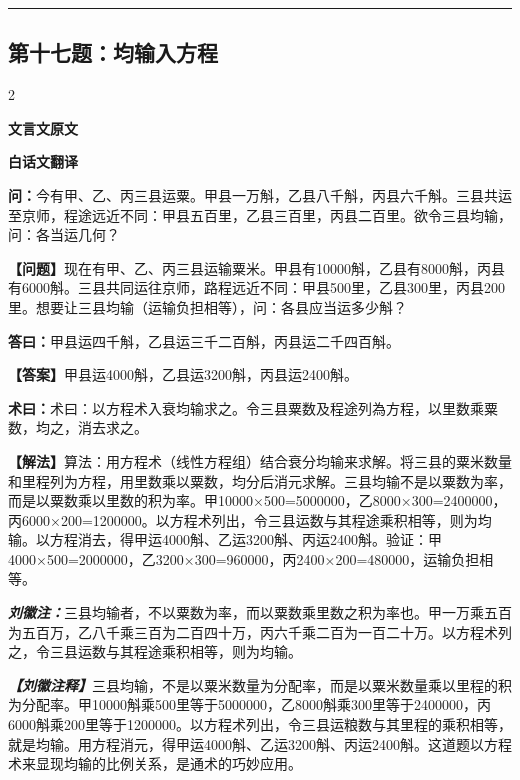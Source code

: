\documentclass[10pt,a4paper]{article}
\newcommand{\wen}[1]{\textbf{\color{problemcolor}问：}#1\par}
\newcommand{\da}[1]{\textbf{答曰：}#1\par}
\newcommand{\shu}[1]{\textbf{术曰：}#1\par}
\newcommand{\liuhui}[1]{{\color{commentarycolor}\textit{\textbf{刘徽注：}}#1\par}}
\newcommand{\classicalheader}[1]{{\centering\large\bfseries\color{classicalcolor} #1\par\vspace{0.5em}}}
\newcommand{\wenmodern}[1]{\textbf{\color{moderncolor}【问题】}#1\par}
\newcommand{\damodern}[1]{\textbf{【答案】}#1\par}
\newcommand{\shumodern}[1]{\textbf{【解法】}#1\par}
\newcommand{\liuhuimodern}[1]{{\color{commentarycolor}\textit{\textbf{【刘徽注释】}}#1\par}}
\newcommand{\modernheader}[1]{{\centering\large\bfseries\color{moderncolor} #1\par\vspace{0.5em}}}
\newcommand{\problemsec}[1]{\subsection*{#1}}
\begin{document}
\vspace{0.3cm}
\hrule
\vspace{0.3cm}

\problemsec{第十七题：均输入方程}
\begin{paracol}{2}
\classicalheader{文言文原文}
\switchcolumn
\modernheader{白话文翻译}
\switchcolumn*

\wen{今有甲、乙、丙三县运粟。甲县一万斛，乙县八千斛，丙县六千斛。三县共运至京师，程途远近不同：甲县五百里，乙县三百里，丙县二百里。欲令三县均输，问：各当运几何？}

\switchcolumn

\wenmodern{现在有甲、乙、丙三县运输粟米。甲县有10000斛，乙县有8000斛，丙县有6000斛。三县共同运往京师，路程远近不同：甲县500里，乙县300里，丙县200里。想要让三县均输（运输负担相等），问：各县应当运多少斛？}

\switchcolumn*

\da{甲县运四千斛，乙县运三千二百斛，丙县运二千四百斛。}

\switchcolumn

\damodern{甲县运4000斛，乙县运3200斛，丙县运2400斛。}

\switchcolumn*

\shu{术曰：以方程术入衰均输求之。令三县粟数及程途列為方程，以里数乘粟数，均之，消去求之。}

\switchcolumn

\shumodern{算法：用方程术（线性方程组）结合衰分均输来求解。将三县的粟米数量和里程列为方程，用里数乘以粟数，均分后消元求解。三县均输不是以粟数为率，而是以粟数乘以里数的积为率。甲10000×500=5000000，乙8000×300=2400000，丙6000×200=1200000。以方程术列出，令三县运数与其程途乘积相等，则为均输。以方程消去，得甲运4000斛、乙运3200斛、丙运2400斛。验证：甲4000×500=2000000，乙3200×300=960000，丙2400×200=480000，运输负担相等。}

\switchcolumn*

\liuhui{三县均输者，不以粟数为率，而以粟数乘里数之积为率也。甲一万乘五百为五百万，乙八千乘三百为二百四十万，丙六千乘二百为一百二十万。以方程术列之，令三县运数与其程途乘积相等，则为均输。}

\switchcolumn

\liuhuimodern{三县均输，不是以粟米数量为分配率，而是以粟米数量乘以里程的积为分配率。甲10000斛乘500里等于5000000，乙8000斛乘300里等于2400000，丙6000斛乘200里等于1200000。以方程术列出，令三县运粮数与其里程的乘积相等，就是均输。用方程消元，得甲运4000斛、乙运3200斛、丙运2400斛。这道题以方程术来显现均输的比例关系，是通术的巧妙应用。}

\end{paracol}
\end{document}
